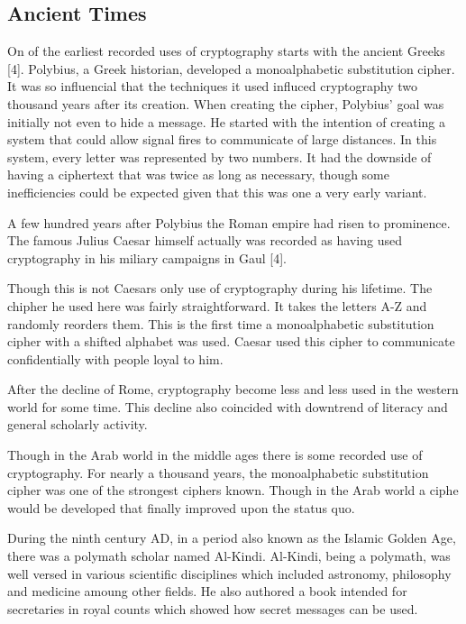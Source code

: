 \documentclass{article}
\begin{document}
    \subsection{Ancient Times}

    On of the earliest recorded uses of cryptography starts with the ancient Greeks [4].
    Polybius, a Greek historian, developed a monoalphabetic substitution cipher. It
    was so influencial that the techniques it used influced cryptography two thousand
    years after its creation.
    When creating the cipher, Polybius' goal was initially not even to hide a message.
    He started with the intention of creating a system that could allow signal fires
    to communicate of large distances. In this system, every letter was represented
    by two numbers. It had the downside of having a ciphertext that was twice as long
    as necessary, though some inefficiencies could be expected given that this
    was one a very early variant.

    A few hundred years after Polybius the Roman empire had risen to prominence.
    The famous Julius Caesar himself actually was recorded as having used cryptography
    in his miliary campaigns in Gaul [4].

    Though this is not Caesars only use of cryptography during his lifetime.
    The chipher he used here was fairly straightforward. It takes the letters A-Z
    and randomly reorders them. This is the first time a monoalphabetic substitution
    cipher with a shifted alphabet was used.
    Caesar used this cipher to communicate confidentially with people loyal to him.

    After the decline of Rome, cryptography become less and less used in the western
    world for some time.
    This decline also coincided with downtrend of literacy and general scholarly activity.

    Though in the Arab world in the middle ages there is some recorded use of cryptography.
    For nearly a thousand years, the monoalphabetic substitution cipher was one
    of the strongest ciphers known. Though in the Arab world a ciphe would be developed
    that finally improved upon the status quo.

    During the ninth century AD, in a period also known as the Islamic Golden Age,
    there was a polymath scholar named Al-Kindi. Al-Kindi, being a polymath, was
    well versed in various scientific disciplines which included astronomy, philosophy
    and medicine amoung other fields. He also authored a book intended for
    secretaries in royal counts which showed how secret messages can be used.
\end{document}
